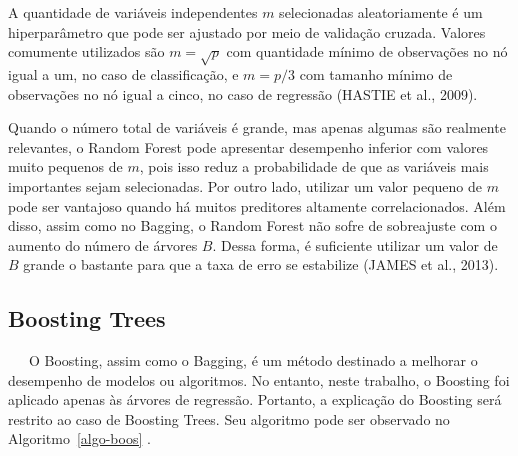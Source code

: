 \documentclass[
  12pt,
  a4paper,
]{scrreprt}
\begin{document}
\vspace{12pt}

A quantidade de variáveis independentes \(m\) selecionadas
aleatoriamente é um hiperparâmetro que pode ser ajustado por meio de
validação cruzada. Valores comumente utilizados são \(m = \sqrt{p}\) com
quantidade mínimo de observações no nó igual a um, no caso de
classificação, e \(m = p/3\) com tamanho mínimo de observações no nó
igual a cinco, no caso de regressão (HASTIE et al., 2009).

\vspace{12pt}

Quando o número total de variáveis é grande, mas apenas algumas são
realmente relevantes, o Random Forest pode apresentar desempenho
inferior com valores muito pequenos de \(m\), pois isso reduz a
probabilidade de que as variáveis mais importantes sejam selecionadas.
Por outro lado, utilizar um valor pequeno de \(m\) pode ser vantajoso
quando há muitos preditores altamente correlacionados. Além disso, assim
como no Bagging, o Random Forest não sofre de sobreajuste com o aumento
do número de árvores \(B\). Dessa forma, é suficiente utilizar um valor
de \(B\) grande o bastante para que a taxa de erro se estabilize (JAMES
et al., 2013).

\subsection{Boosting Trees}\label{boosting-trees}

~~~O Boosting, assim como o Bagging, é um método destinado a melhorar o
desempenho de modelos ou algoritmos. No entanto, neste trabalho, o
Boosting foi aplicado apenas às árvores de regressão. Portanto, a
explicação do Boosting será restrito ao caso de Boosting Trees. Seu
algoritmo pode ser observado no  Algoritmo~\ref{algo-boos} .

\vspace{12pt}
\end{document}
